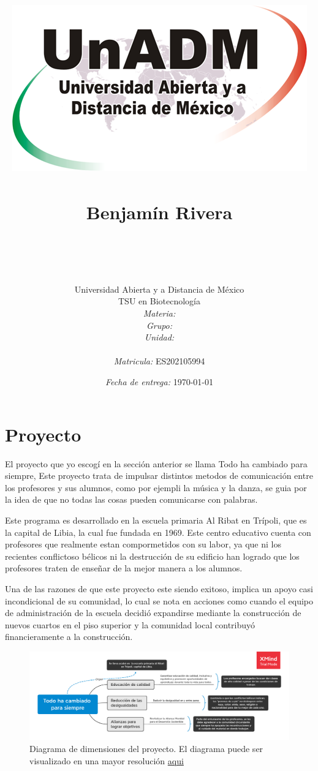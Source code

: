 \documentclass[12pt]{article}
\title{
	\includegraphics{../../../assets/logo-unadm.png} \\
	\ \\ Benjam\'in Rivera \\
	\bf{\titulo}\\\ \\}
\author{
	Universidad Abierta y a Distancia de México \\
	TSU en Biotecnolog\'ia \\
	\textit{Materia:} \materia \\
	\textit{Grupo:} \grupo \\
	\textit{Unidad:} \unidad \\
	\\
	\textit{Matricula:} ES202105994 }
\date{\textit{Fecha de entrega:} \today}
\begin{document}
\maketitle\newpage

\section*{Proyecto}

	\par El proyecto que yo escogí en la sección anterior se llama Todo ha cambiado para siempre, Este proyecto trata de impulsar distintos metodos de comunicación entre los profesores y sus alumnos, como por ejempli la música y la danza, se guia por la idea de que no todas las cosas pueden comunicarse con palabras.

	\par Este programa es desarrollado en la escuela primaria Al Ribat en Trípoli, que es la capital de Libia, la cual fue fundada en 1969. Este centro educativo cuenta con profesores que realmente estan compormetidos con su labor, ya que ni los recientes conflictoso bélicos ni la destrucción de su edificio han logrado que los profesores traten de enseñar de la mejor manera a los alumnos.
	
	\par Una de las razones de que este proyecto este siendo exitoso, implica un apoyo casi incondicional de su comunidad, lo cual se nota en acciones como cuando el equipo de administración de la escuela decidió expandirse mediante la construcción de nuevos cuartos en el piso superior y la comunidad local contribuyó financieramente a la construcción.
	
\begin{figure}
	\centering
	\includegraphics [width=0.98\textheight, angle=90] {BDSU-U2-A3-1.png}
	\caption{Diagrama de dimensiones del proyecto. El diagrama puede ser visualizado en una mayor resolución \href{https://github.com/BenchHPZ/UnADM-Biotecnologia/tree/master/B1-1/BDSU/Actividades/assets/BDSU-U2-A3-1.png}{aqui}}
\end{figure}
\end{document}
